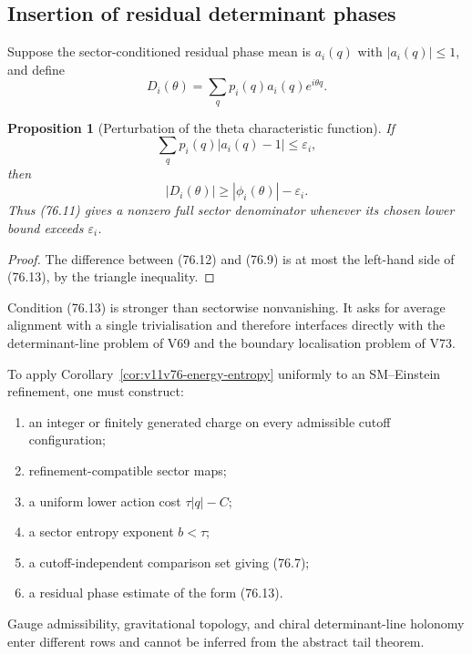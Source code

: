 \documentclass[11pt]{article}
\newtheorem{proposition}[theorem]{Proposition}
\begin{document}
\subsection{Insertion of residual determinant phases}

Suppose the sector-conditioned residual phase mean is \(a_i(q)\) with
\(|a_i(q)|\le1\), and define
\[
 D_i(\theta)=\sum_qp_i(q)a_i(q)e^{i\theta q}.                 \tag{76.12}
\]

\begin{proposition}[Perturbation of the theta characteristic function]
\label{prop:v11v76-residual}
If
\[
                    \sum_qp_i(q)|a_i(q)-1|\le\varepsilon_i,  \tag{76.13}
\]
then
\[
 |D_i(\theta)|\ge|\phi_i(\theta)|-\varepsilon_i.              \tag{76.14}
\]
Thus (76.11) gives a nonzero full sector denominator whenever its
chosen lower bound exceeds \(\varepsilon_i\).
\end{proposition}

\begin{proof}
The difference between (76.12) and (76.9) is at most the left-hand
side of (76.13), by the triangle inequality.
\end{proof}

Condition (76.13) is stronger than sectorwise nonvanishing.  It asks
for average alignment with a single trivialisation and therefore
interfaces directly with the determinant-line problem of V69 and the
boundary localisation problem of V73.

\begin{ledger}
\label{led:v11v76-acquisition}
To apply Corollary~\ref{cor:v11v76-energy-entropy} uniformly to an
SM--Einstein refinement, one must construct:
\begin{enumerate}
\item an integer or finitely generated charge on every admissible
      cutoff configuration;
\item refinement-compatible sector maps;
\item a uniform lower action cost \(\tau|q|-C\);
\item a sector entropy exponent \(b<\tau\);
\item a cutoff-independent comparison set giving (76.7);
\item a residual phase estimate of the form (76.13).
\end{enumerate}
Gauge admissibility, gravitational topology, and chiral
determinant-line holonomy enter different rows and cannot be inferred
from the abstract tail theorem.
\end{ledger}
\end{document}
